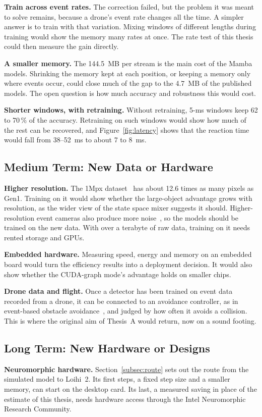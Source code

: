 \documentclass[11pt, a4paper]{report}
\begin{document}
\textbf{Train across event rates.} The correction failed, but the problem it was meant to solve remains, because a drone's event rate changes all the time. A simpler answer is to train with that variation. Mixing windows of
different lengths during training would show the memory many rates at once. The rate test of this thesis
could then measure the gain directly.

\textbf{A smaller memory.} The 144.5~MB per stream is the main cost of the Mamba models. Shrinking the memory
kept at each position, or keeping a memory only where events occur, could close much of the gap to the
4.7~MB of the published models. The open question is how much accuracy and robustness this would cost.

\textbf{Shorter windows, with retraining.} Without retraining, 5-ms windows keep 62 to 70\,\% of the
accuracy. Retraining on such windows would show how much of the rest can be recovered, and Figure~\ref{fig:latency} shows that the reaction time would fall from 38--52~ms to about 7 to 8~ms.

\subsection{Medium Term: New Data or Hardware}
\textbf{Higher resolution.} The 1Mpx dataset~\cite{perot2020learning} has about 12.6 times as many pixels as
Gen1. Training on it would show whether the large-object advantage grows with resolution, as the wider view
of the state space mixer suggests it should. Higher-resolution event cameras also produce more
noise~\cite{gehrig2022high}, so the models should be trained on the new data.
With over a terabyte of raw data, training on it needs rented storage and GPUs.

\textbf{Embedded hardware.} Measuring speed, energy and memory on an embedded board would turn the efficiency
results into a deployment decision. It would also show whether the CUDA-graph mode's advantage holds on smaller
chips.

\textbf{Drone data and flight.} Once a detector has been trained on event data recorded from a drone, it can
be connected to an avoidance controller, as in event-based obstacle avoidance~\cite{falanga2020dynamic}, and
judged by how often it avoids a collision. This is where the original aim of Thesis~A would return, now on a
sound footing.

\subsection{Long Term: New Hardware or Designs}
\textbf{Neuromorphic hardware.} Section~\ref{subsec:route} sets out the route from the simulated model to
Loihi~2. Its first steps, a fixed step size and a smaller memory, can start on the desktop card. Its last, a
measured saving in place of the estimate of this thesis, needs hardware access through the Intel Neuromorphic
Research Community.
\end{document}

